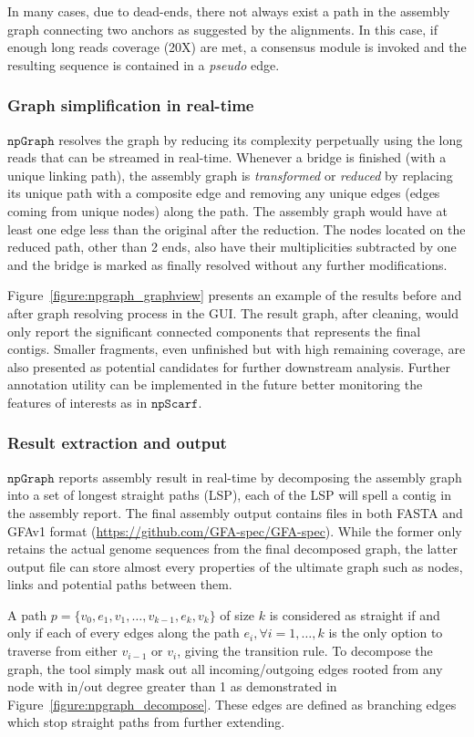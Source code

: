 \documentclass[10pt,letterpaper]{article}
\newcommand{\npscarf}{$\mathtt{npScarf}$}
\newcommand{\npgraph}{$\mathtt{npGraph}$}
\begin{document}
In many cases, due to dead-ends, there not always exist a path in the assembly graph connecting two anchors as suggested by the alignments. In this case, if enough long reads coverage (20X) are met, a consensus module is invoked and the resulting sequence is contained in a \emph{pseudo} edge.
\subsubsection*{Graph simplification in real-time}
\npgraph{} resolves the graph by reducing its complexity perpetually using the long reads that can be streamed in real-time.
Whenever a bridge is finished (with a unique linking path), the assembly graph is \emph{transformed} or \emph{reduced} by replacing its unique path with a composite edge and removing any unique edges (edges coming from unique nodes) along the path. The assembly graph would have at least one edge less than the original after the reduction. The nodes located on the reduced path, other than 2 ends, also have their multiplicities subtracted by one and the bridge is marked as finally resolved without any further modifications. 


Figure~\ref{figure:npgraph_graphview} presents an example of the results before and after graph resolving process in the GUI.
The result graph, after cleaning, would only report the significant connected components that represents the final contigs.
Smaller fragments, even unfinished but with high remaining coverage, are also presented as potential candidates for further downstream analysis.
Further annotation utility can be implemented in the future better monitoring the features of interests as in \npscarf{}.
\subsubsection*{Result extraction and output}
\npgraph{} reports assembly result in real-time by decomposing the assembly graph into a set of longest straight paths (LSP), each of the LSP will spell a contig in the assembly report.
The final assembly output contains files in both FASTA and GFAv1 format (\url{https://github.com/GFA-spec/GFA-spec}). While the former only retains the actual genome sequences from the final decomposed graph, the latter output file can store almost every properties of the ultimate graph such as nodes, links and potential paths between them.

A path $p=\{v_0,e_1,v_1,\ldots,v_{k-1},e_k,v_k\}$ of size $k$ is considered as straight if and only if each of every edges along the path $e_i, \forall i=1,\ldots,k$ is the only option to traverse from either $v_{i-1}$ or $v_i$, giving the transition rule.
To decompose the graph, the tool simply mask out all incoming/outgoing edges rooted from any node with in/out degree greater than 1 as demonstrated in Figure~\ref{figure:npgraph_decompose}. These edges are defined as branching edges which stop straight paths from further extending.
\end{document}
